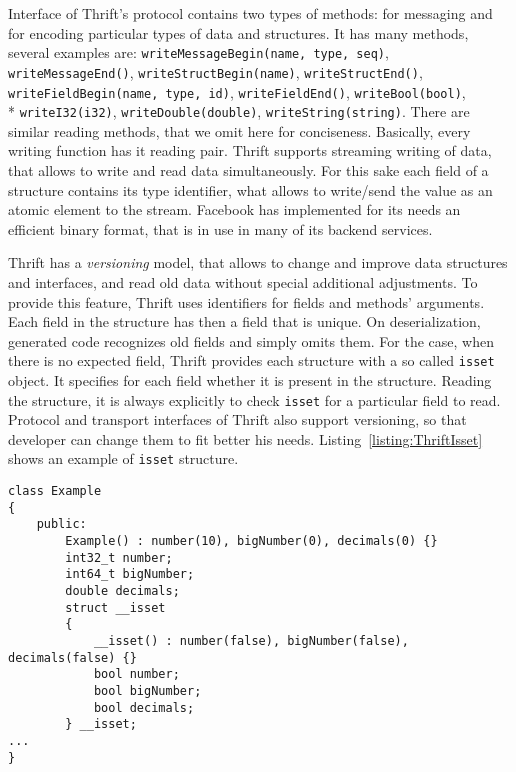 Interface of Thrift's protocol contains two types of methods: for messaging and for encoding particular types of data and structures.
It has many methods, several examples are: \lstinline{writeMessageBegin(name, type, seq)}, \lstinline{writeMessageEnd()}, \lstinline{writeStructBegin(name)}, \lstinline{writeStructEnd()}, \lstinline{writeFieldBegin(name, type, id)}, \lstinline{writeFieldEnd()}, \lstinline{writeBool(bool)}, \\* \lstinline{writeI32(i32)}, \lstinline{writeDouble(double)}, \lstinline{writeString(string)}.
There are similar reading methods, that we omit here for conciseness.
Basically, every writing function has it reading pair.
Thrift supports streaming writing of data, that allows to write and read data simultaneously.
For this sake each field of a structure contains its type identifier, what allows to write/send the value as an atomic element to the stream.
Facebook has implemented for its needs an efficient binary format, that is in use in many of its backend services.

Thrift has a \textit{versioning}  model, that allows to change and improve data structures and interfaces, and read old data without special additional adjustments.
To provide this feature, Thrift uses identifiers for fields and methods' arguments.
Each field in the structure has then a field that is unique.
On deserialization, generated code recognizes old fields and simply omits them.
For the case, when there is no expected field, Thrift provides each structure with a so called \lstinline{isset} object.
It specifies for each field whether it is present in the structure.
Reading the structure, it is always explicitly to check \lstinline{isset} for a particular field to read.
Protocol and transport interfaces of Thrift also support versioning, so that developer can change them to fit better his needs.
Listing~\ref{listing:ThriftIsset} shows an example of \lstinline{isset} structure.

\begin{lstlisting}[float=h, caption=Example of isset structure., label=listing:ThriftIsset]
class Example
{
	public:
		Example() :	number(10),	bigNumber(0), decimals(0) {}
		int32_t number;
		int64_t bigNumber;
		double decimals;
		struct __isset
		{
			__isset() :	number(false), bigNumber(false), decimals(false) {}
			bool number;
			bool bigNumber;
			bool decimals;
		} __isset;
...
}
\end{lstlisting}


